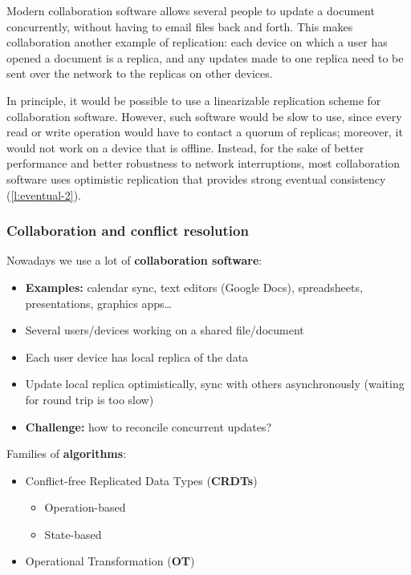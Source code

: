 Modern collaboration software allows several people to update a document concurrently, without having to email files back and forth.
This makes collaboration another example of replication: each device on which a user has opened a document is a replica, and any updates made to one replica need to be sent over the network to the replicas on other devices.

In principle, it would be possible to use a linearizable replication scheme for collaboration software.
However, such software would be slow to use, since every read or write operation would have to contact a quorum of replicas; moreover, it would not work on a device that is offline.
Instead, for the sake of better performance and better robustness to network interruptions, most collaboration software uses optimistic replication that provides strong eventual consistency (\autoref{l:eventual-2}).

\begin{frame}
    \label{s:collaboration}
    \frametitle{Collaboration and conflict resolution}
    Nowadays we use a lot of \textbf{collaboration software}:
    \begin{itemize}
        \item \textbf{Examples:} calendar sync, text editors (Google Docs), spreadsheets, presentations, graphics apps\dots\pause
        \item Several users/devices working on a shared file/document
        \item Each user device has local replica of the data\pause
        \item Update local replica optimistically, sync with others asynchronously (waiting for round trip is too slow)\pause
        \item \textbf{Challenge:} how to reconcile concurrent updates?\\[1em]\pause
    \end{itemize}
    Families of \textbf{algorithms}:
    \begin{itemize}
        \item Conflict-free Replicated Data Types (\textbf{CRDTs})
            \begin{itemize}
                \item Operation-based
                \item State-based
            \end{itemize}
        \item Operational Transformation (\textbf{OT})
    \end{itemize}
\end{frame}
\label{l:collaboration}

